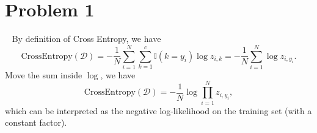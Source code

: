 \section{Problem 1}~\label{sec:prob1}
By definition of Cross Entropy, we have
\begin{equation}
    \text{CrossEntropy}(\mathcal{D}) =
        -\frac{1}{N}\sum_{i=1}^{N}\sum_{k=1}^c \mathbb{I}(k=y_i)\log{z_{i,k}}
    =-\frac{1}{N}\sum_{i=1}^{N}\log{z_{i,y_i}}.
\end{equation}
Move the sum inside $\log$, we have
\begin{equation}
    \text{CrossEntropy}(\mathcal{D}) =
    -\frac{1}{N}\log{\prod_{i=1}^{N}z_{i,y_i}},
\end{equation}
which can be interpreted as the negative log-likelihood on the training set
(with a constant factor).
